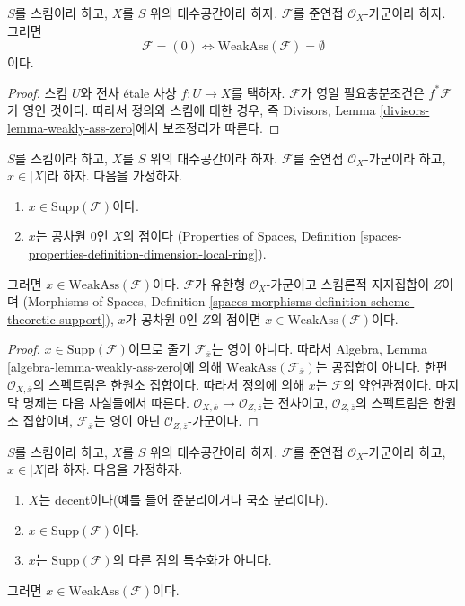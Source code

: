 \begin{lemma}
\label{lemma-weakly-ass-zero}
$S$를 스킴이라 하고, $X$를 $S$ 위의 대수공간이라 하자.
$\mathcal{F}$를 준연접 $\mathcal{O}_X$-가군이라 하자. 그러면
$$
\mathcal{F} = (0) \Leftrightarrow \text{WeakAss}(\mathcal{F}) = \emptyset
$$
이다.
\end{lemma}

\begin{proof}
스킴 $U$와 전사 \'etale 사상 $f : U \to X$를 택하자.
$\mathcal{F}$가 영일 필요충분조건은 $f^*\mathcal{F}$가 영인 것이다.
따라서 정의와 스킴에 대한 경우, 즉 Divisors, Lemma
\ref{divisors-lemma-weakly-ass-zero}에서 보조정리가 따른다.
\end{proof}

\begin{lemma}
\label{lemma-minimal-support-in-weakly-ass}
$S$를 스킴이라 하고, $X$를 $S$ 위의 대수공간이라 하자.
$\mathcal{F}$를 준연접 $\mathcal{O}_X$-가군이라 하고, $x \in |X|$라 하자.
다음을 가정하자.
\begin{enumerate}
\item $x \in \text{Supp}(\mathcal{F})$이다.
\item $x$는 공차원 $0$인 $X$의 점이다
(Properties of Spaces, Definition
\ref{spaces-properties-definition-dimension-local-ring}).
\end{enumerate}
그러면 $x \in \text{WeakAss}(\mathcal{F})$이다.
$\mathcal{F}$가 유한형 $\mathcal{O}_X$-가군이고 스킴론적 지지집합이 $Z$이며
(Morphisms of Spaces, Definition
\ref{spaces-morphisms-definition-scheme-theoretic-support}),
$x$가 공차원 $0$인 $Z$의 점이면
$x \in \text{WeakAss}(\mathcal{F})$이다.
\end{lemma}

\begin{proof}
$x \in \text{Supp}(\mathcal{F})$이므로 줄기
$\mathcal{F}_{\overline{x}}$는 영이 아니다. 따라서 Algebra, Lemma
\ref{algebra-lemma-weakly-ass-zero}에 의해
$\text{WeakAss}(\mathcal{F}_{\overline{x}})$는 공집합이 아니다.
한편 $\mathcal{O}_{X, \overline{x}}$의 스펙트럼은 한원소 집합이다.
따라서 정의에 의해 $x$는 $\mathcal{F}$의 약연관점이다.
마지막 명제는 다음 사실들에서 따른다.
$\mathcal{O}_{X, \overline{x}} \to \mathcal{O}_{Z, \overline{z}}$는
전사이고, $\mathcal{O}_{Z, \overline{z}}$의 스펙트럼은 한원소 집합이며,
$\mathcal{F}_{\overline{x}}$는 영이 아닌
$\mathcal{O}_{Z, \overline{z}}$-가군이다.
\end{proof}

\begin{lemma}
\label{lemma-minimal-support-in-weakly-ass-decent}
$S$를 스킴이라 하고, $X$를 $S$ 위의 대수공간이라 하자.
$\mathcal{F}$를 준연접 $\mathcal{O}_X$-가군이라 하고, $x \in |X|$라 하자.
다음을 가정하자.
\begin{enumerate}
\item $X$는 decent이다(예를 들어 준분리이거나 국소 분리이다).
\item $x \in \text{Supp}(\mathcal{F})$이다.
\item $x$는 $\text{Supp}(\mathcal{F})$의 다른 점의 특수화가 아니다.
\end{enumerate}
그러면 $x \in \text{WeakAss}(\mathcal{F})$이다.
\end{lemma}

